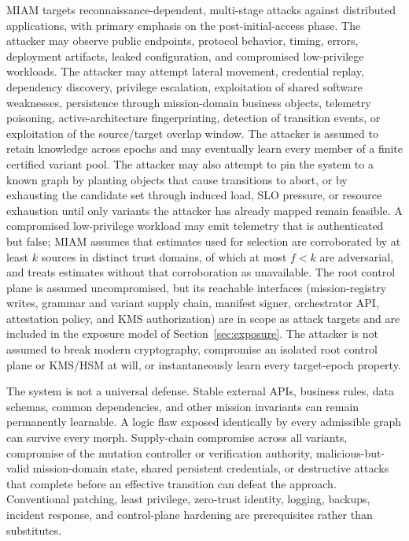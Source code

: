 \documentclass[11pt,letterpaper]{article}
\begin{document}
MIAM targets reconnaissance-dependent, multi-stage attacks against distributed applications, with primary emphasis on the post-initial-access phase. The attacker may observe public endpoints, protocol behavior, timing, errors, deployment artifacts, leaked configuration, and compromised low-privilege workloads. The attacker may attempt lateral movement, credential replay, dependency discovery, privilege escalation, exploitation of shared software weaknesses, persistence through mission-domain business objects, telemetry poisoning, active-architecture fingerprinting, detection of transition events, or exploitation of the source/target overlap window. The attacker is assumed to retain knowledge across epochs and may eventually learn every member of a finite certified variant pool. The attacker may also attempt to pin the system to a known graph by planting objects that cause transitions to abort, or by exhausting the candidate set through induced load, SLO pressure, or resource exhaustion until only variants the attacker has already mapped remain feasible. A compromised low-privilege workload may emit telemetry that is authenticated but false; MIAM assumes that estimates used for selection are corroborated by at least $k$ sources in distinct trust domains, of which at most $f<k$ are adversarial, and treats estimates without that corroboration as unavailable. The root control plane is assumed uncompromised, but its reachable interfaces (mission-registry writes, grammar and variant supply chain, manifest signer, orchestrator API, attestation policy, and KMS authorization) are in scope as attack targets and are included in the exposure model of Section~\ref{sec:exposure}. The attacker is not assumed to break modern cryptography, compromise an isolated root control plane or KMS/HSM at will, or instantaneously learn every target-epoch property.

The system is not a universal defense. Stable external APIs, business rules, data schemas, common dependencies, and other mission invariants can remain permanently learnable. A logic flaw exposed identically by every admissible graph can survive every morph. Supply-chain compromise across all variants, compromise of the mutation controller or verification authority, malicious-but-valid mission-domain state, shared persistent credentials, or destructive attacks that complete before an effective transition can defeat the approach. Conventional patching, least privilege, zero-trust identity, logging, backups, incident response, and control-plane hardening are prerequisites rather than substitutes.
\end{document}
